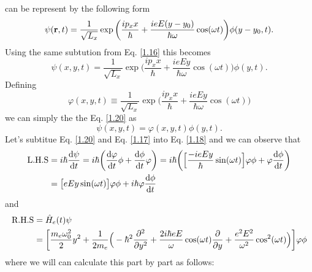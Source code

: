 \documentclass[a4paper]{article}
\numberwithin{equation}{subsection}
\numberwithin{equation}{section}
\begin{document}
can be represent by the following form
\begin{equation} \label{1.19}
    \psi(\vb{r},t) = \frac{1}{\sqrt{L_x}} \exp\bigg(
      \frac{ip_x x}{\hbar} +
      \frac{ieE(y-y_0)}{\hbar \omega}\cos(\omega t)
    \bigg) \phi(y-y_0,t).
\end{equation}
Using the same subtution from Eq. \eqref{1.16} this becomes
\begin{equation} \label{1.20}
    \psi(x,y,t) = \frac{1}{\sqrt{L_x}} \exp\bigg(
      \frac{ip_x x}{\hbar} +
      \frac{ieEy}{\hbar \omega}\cos(\omega t)
    \bigg) \phi(y,t).
\end{equation}
Defining
\begin{equation} \label{1.21}
    \varphi(x,y,t) \equiv \frac{1}{\sqrt{L_x}} \exp\bigg(
      \frac{ip_x x}{\hbar} +
      \frac{ieEy}{\hbar \omega}\cos(\omega t)
    \bigg)
\end{equation}
we can simply the the Eq. \eqref{1.20} as
\begin{equation} \label{1.22}
    \psi(x,y,t) = \varphi(x,y,t) \phi(y,t).
\end{equation}
Let's subtitue Eq. \eqref{1.20} and Eq. \eqref{1.17} into Eq. \eqref{1.18} and we can observe that
\begin{equation} \label{1.23}
  \begin{aligned}
    \text{L.H.S} & = i \hbar \dv{\psi}{t} =
    i \hbar \bigg( \dv{\varphi}{t} \phi + \dv{\phi}{t} \varphi \bigg) =
    i \hbar \bigg(
      \Big[\frac{-ieEy}{\hbar}\sin(\omega t)\Big]\varphi\phi +
      \varphi  \dv{\phi}{t}
    \bigg) \\
    & =
    \big[{eEy}\sin(\omega t)\big]\varphi\phi +
    i \hbar\varphi  \dv{\phi}{t}
  \end{aligned}
\end{equation}
and
\begin{equation} \label{1.24}
  \begin{aligned}
    \text{R.H.S} & = \hat{H}_e(t)\psi \\
    & =
    \bigg[
    \frac{m_e \omega_0^2}{2}y^2 +
    \frac{1}{2m_e}\Big(
    -\hbar^2 \pdv[2]{y} +
    \frac{2i\hbar eE}{\omega}\cos(\omega t) \pdv{y}+
    \frac{e^2E^2}{\omega^2}\cos[2](\omega t)
    \Big) \bigg]
    \varphi\phi
  \end{aligned}
\end{equation}
where we will can calculate this part by part as follows:
\end{document}

